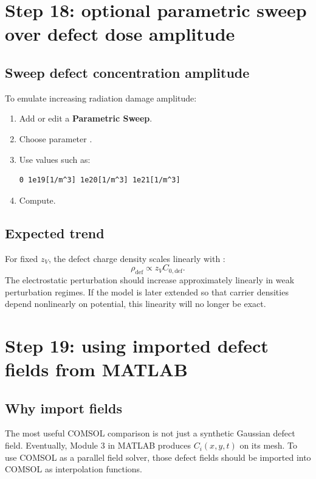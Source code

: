 \documentclass[11pt]{article}
\newcommand{\code}[1]{\texttt{\detokenize{#1}}}
\begin{document}
\section{Step 18: optional parametric sweep over defect dose amplitude}

\subsection{Sweep defect concentration amplitude}

To emulate increasing radiation damage amplitude:
\begin{enumerate}[leftmargin=2em]
\item Add or edit a \textbf{Parametric Sweep}.
\item Choose parameter \code{C0def}.
\item Use values such as:
\begin{verbatim}
0 1e19[1/m^3] 1e20[1/m^3] 1e21[1/m^3]
\end{verbatim}
\item Compute.
\end{enumerate}

\subsection{Expected trend}

For fixed $z_V$, the defect charge density scales linearly with \code{C0def}:
\begin{equation}
\rho_{\mathrm{def}}\propto z_V C_{0,\mathrm{def}}.
\end{equation}
The electrostatic perturbation should increase approximately linearly in weak perturbation regimes. If the model is later extended so that carrier densities depend nonlinearly on potential, this linearity will no longer be exact.

\section{Step 19: using imported defect fields from MATLAB}

\subsection{Why import fields}

The most useful COMSOL comparison is not just a synthetic Gaussian defect field. Eventually, Module 3 in MATLAB produces $C_i(x,y,t)$ on its mesh. To use COMSOL as a parallel field solver, those defect fields should be imported into COMSOL as interpolation functions.
\end{document}
